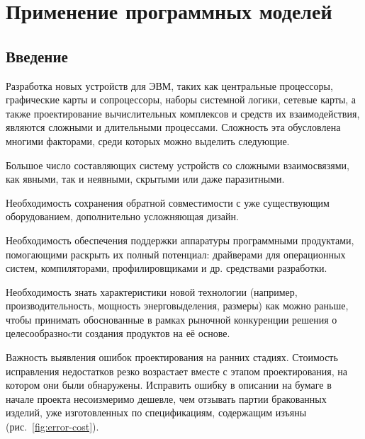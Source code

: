 \chapter{Применение программных моделей}\label{chapter01}


\section{Введение}

Разработка новых устройств для ЭВМ, таких как центральные процессоры, графические карты и сопроцессоры, наборы системной логики, сетевые карты, а также проектирование вычислительных комплексов и средств их взаимодействия, являются сложными и длительными процессами. Сложность эта обусловлена многими факторами, среди которых можно выделить следующие.

\begin{itemize*}
\item Большое число составляющих систему устройств со сложными взаимосвязями, как явными, так и неявными, скрытыми или даже паразитными.   

\item Необходимость сохранения обратной совместимости с уже существующим оборудованием, дополнительно усложняющая дизайн.

\item Необходимость обеспечения поддержки аппаратуры программными продуктами, помогающими раскрыть их полный потенциал: драйверами для операционных систем, компиляторами, профилировщиками и др. средствами разработки.

\item Необходимость знать характеристики новой технологии (например, производительность, мощность энерговыделения, размеры) как можно раньше, чтобы принимать обоснованные в рамках рыночной конкуренции решения о целесообразноcти создания продуктов на её основе.

\item Важность выявления ошибок проектирования на ранних стадиях. Стоимость исправления недостатков резко возрастает вместе с этапом проектирования, на котором они были обнаружены. Исправить ошибку в описании на бумаге в начале проекта несоизмеримо дешевле, чем отзывать партии бракованных изделий, уже изготовленных по спецификациям, содержащим изъяны (рис.~\ref{fig:error-cost}).

\end{itemize*}

